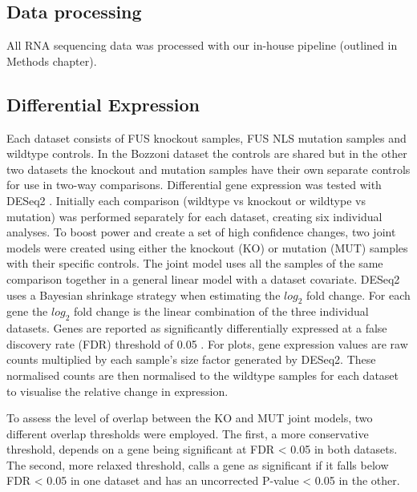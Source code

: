 \subsection{Data processing}
All RNA sequencing data was processed with our in-house pipeline (outlined in Methods chapter).

\subsection{Differential Expression}
 Each dataset consists of FUS knockout samples, FUS NLS mutation samples and wildtype controls.
In the Bozzoni dataset the controls are shared but in the other two datasets the knockout and mutation samples have their own separate controls for use in two-way comparisons.
Differential gene expression was tested with DESeq2 \citep{Love2014}.
Initially each comparison (wildtype vs knockout or wildtype vs mutation) was performed separately for each dataset, creating six individual analyses.
To boost power and create a set of high confidence changes, two joint models were created using either the knockout (KO) or mutation (MUT) samples with their specific controls.
The joint model uses all the samples of the same comparison together in a general linear model with a dataset covariate. 
DESeq2 uses a Bayesian shrinkage strategy when estimating the $log_2$ fold change. 
For each gene the $log_2$ fold change is the linear combination of the three individual datasets.
Genes are reported as significantly differentially expressed at a false discovery rate (FDR) threshold of 0.05 \citep{Benjamini1995}. 
For plots, gene expression values are  raw counts multiplied by each sample's size factor generated by DESeq2. 
These normalised counts are then normalised to the wildtype samples for each dataset to visualise the relative change in expression.

To assess the level of overlap between the KO and MUT joint models, two different overlap thresholds were employed.
The first, a more conservative threshold, depends on a gene being significant at FDR < 0.05 in both datasets.
The second, more relaxed threshold, calls a gene as significant if it falls below FDR < 0.05 in one dataset and has an uncorrected P-value < 0.05 in the other.

